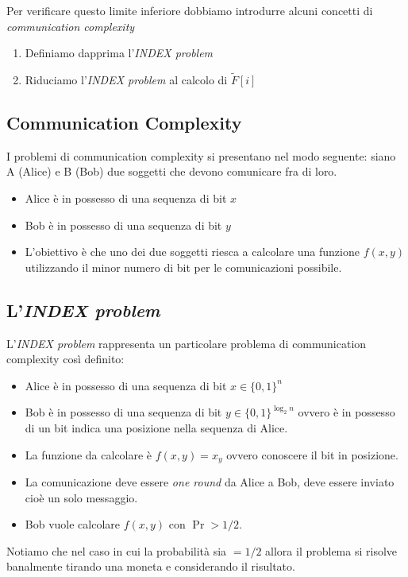 \documentclass[a4paper,11pt]{book}
\begin{document}
Per verificare questo limite inferiore dobbiamo introdurre alcuni concetti di \emph{communication complexity}
\begin{enumerate}
\item Definiamo dapprima l'\emph{INDEX problem}
\item Riduciamo l'\emph{INDEX problem} al calcolo di $\tilde{F}[i]$ 
\end{enumerate}

\subsection{Communication Complexity}

I problemi di communication complexity si presentano nel modo seguente: siano A (Alice) e B (Bob) due soggetti che devono comunicare fra di loro.
\begin{itemize}
\item Alice \`e in possesso di una sequenza di bit $x$
\item Bob \`e in possesso di una sequenza di bit $y$
\item L'obiettivo \`e che uno dei due soggetti riesca a calcolare una funzione $f(x,y)$ utilizzando il minor numero di bit per le comunicazioni possibile.
\end{itemize}

\subsection{L'\emph{INDEX problem}}

L'\emph{INDEX problem} rappresenta un particolare problema di communication complexity cos\`i definito:
\begin{itemize}
\item Alice \`e in possesso di una sequenza di bit $x \in \{0,1\}^n$
\item Bob \`e in possesso di una sequenza di bit $y \in \{0,1\}^{\log_2 n}$ ovvero \`e in possesso di un bit indica una posizione nella sequenza di Alice.
\item La funzione da calcolare \`e $f(x,y) = x_y$ ovvero conoscere il bit in posizione.
\item La comunicazione deve essere \emph{one round} da Alice a Bob, deve essere inviato cio\`e un solo messaggio.
\item Bob vuole calcolare $f(x,y)$ con $\Pr > 1/2$.
\end{itemize}
Notiamo che nel caso in cui la probabilit\`a sia $= 1/2$ allora il problema si risolve banalmente tirando una moneta e considerando il risultato.
\end{document}
